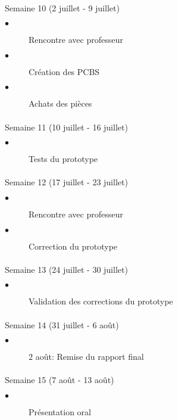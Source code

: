 \begin{multicols}{2}
		
		\paragraph{}
		Semaine 10 (2 juillet - 9 juillet)
			\begin{description}
				\item[$\bullet$] Rencontre avec professeur
				\item[$\bullet$] Création des PCBS
				\item[$\bullet$] Achats des pièces				
			\end{description}		
		
		\paragraph{}
		Semaine 11 (10 juillet - 16 juillet)
			\begin{description}
				\item[$\bullet$] Tests du prototype
			\end{description}

			
		\paragraph{}
		Semaine 12 (17 juillet - 23 juillet)
			\begin{description}
				\item[$\bullet$] Rencontre avec professeur
				\item[$\bullet$] Correction du prototype				
			\end{description}		
		
		\paragraph{}
		Semaine 13 (24 juillet - 30 juillet)
			\begin{description}
				\item[$\bullet$] Validation des corrections du prototype
			\end{description}
		
		\paragraph{}
		Semaine 14 (31 juillet - 6 août)
			\begin{description}
				\item[$\bullet$] 2 août: Remise du rapport final
			\end{description}	
			
		\paragraph{}
		Semaine 15 (7 août - 13 août)
			\begin{description}		
				\item[$\bullet$] Présentation oral
			\end{description}	
		\end{multicols}
